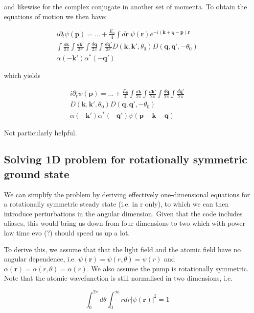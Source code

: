 \documentclass[a4paper,twocolumn,nobalancelastpage]{revtex4-1}
\begin{document}
and likewise for the complex conjugate in another set of momenta. To obtain the equations of motion we then have:

\begin{multline}
i \partial_t \psi(\textbf{p})=...+\frac{E_0}{4}\int d\textbf{r} \
\psi(\textbf{r}) e^{-i (\textbf{k}+\textbf{q}-\textbf{p})\textbf{r}} \\
 \int \frac{d \textbf{k}}{2 \pi} \int \frac{d \textbf{k}'}{2 \pi}
\int \frac{d \textbf{q}}{2 \pi} \int \frac{d \textbf{q}'}{2 \pi}  D(\textbf{k},\textbf{k}',\theta_0) D(\textbf{q},\textbf{q}',-\theta_0) \\  \alpha(-\textbf{k}') \alpha^*(-\textbf{q}') 
\end{multline}

which yields

\begin{multline}
i \partial_t \psi(\textbf{p})=...+\frac{E_0}{4}
 \int \frac{d \textbf{k}}{2 \pi} \int \frac{d \textbf{k}'}{2 \pi}
\int \frac{d \textbf{q}}{2 \pi} \int \frac{d \textbf{q}'}{2 \pi}  \\ D(\textbf{k},\textbf{k}',\theta_0) D(\textbf{q},\textbf{q}',-\theta_0) \\  \alpha(-\textbf{k}') \alpha^*(-\textbf{q}') \psi(\textbf{p}-\textbf{k}-\textbf{q})
\end{multline}

Not particularly helpful.


\subsection{Solving 1D problem for rotationally symmetric ground state}

We can simplify the problem by deriving effectively one-dimensional equations for a rotationally symmetric steady state (i.e. in r only), to which we can then introduce perturbations in the angular dimension. Given that the code includes aliases, this would bring us down from four dimensions to two which with power law time evo (?) should speed us up a lot.

To derive this, we assume that that the light field and the atomic field have no angular dependence, i.e. $\psi(\textbf{r})=\psi(r,\theta)=\psi(r)$ and  $\alpha(\textbf{r})=\alpha(r,\theta)=\alpha(r)$. We also assume the pump is rotationally symmetric.
Note that the atomic wavefunction is still normalised in two dimensions, i.e.

\begin{equation}
\int_{0}^{2 \pi} d \theta \int_0^{\infty} r dr |\psi(\textbf{r})|^2=1
\end{equation}
\end{document}
